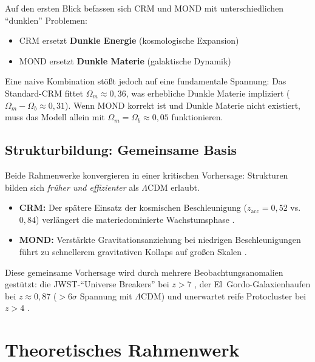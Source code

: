 \documentclass[aps,prd,twocolumn,superscriptaddress,nofootinbib,floatfix]{revtex4-2}
\begin{document}
Auf den ersten Blick befassen sich CRM und MOND mit unterschiedlichen "`dunklen"' Problemen:
\begin{itemize}
\item CRM ersetzt \textbf{Dunkle Energie} (kosmologische Expansion)
\item MOND ersetzt \textbf{Dunkle Materie} (galaktische Dynamik)
\end{itemize}

Eine naive Kombination stößt jedoch auf eine fundamentale Spannung: Das Standard-CRM fittet $\Omega_m \approx 0{,}36$, was erhebliche Dunkle Materie impliziert ($\Omega_m - \Omega_b \approx 0{,}31$). Wenn MOND korrekt ist und Dunkle Materie nicht existiert, muss das Modell allein mit $\Omega_m = \Omega_b \approx 0{,}05$ funktionieren.

\subsection{Strukturbildung: Gemeinsame Basis}

Beide Rahmenwerke konvergieren in einer kritischen Vorhersage: Strukturen bilden sich \textit{früher und effizienter} als $\Lambda$CDM erlaubt.

\begin{itemize}
\item \textbf{CRM:} Der spätere Einsatz der kosmischen Beschleunigung ($z_{\mathrm{acc}} = 0{,}52$ vs.\ $0{,}84$) verlängert die materiedominierte Wachstumsphase \cite{Geiger2026}.
\item \textbf{MOND:} Verstärkte Gravitationsanziehung bei niedrigen Beschleunigungen führt zu schnellerem gravitativen Kollaps auf großen Skalen \cite{Asencio2023}.
\end{itemize}

Diese gemeinsame Vorhersage wird durch mehrere Beobachtungsanomalien gestützt: die JWST-"`Universe Breakers"' bei $z > 7$ \cite{Labbe2023, BoylanKolchin2023}, der El~Gordo-Galaxienhaufen bei $z \approx 0{,}87$ (${>}6\sigma$ Spannung mit $\Lambda$CDM) \cite{Asencio2023} und unerwartet reife Protocluster bei $z > 4$ \cite{Miller2018}.

\section{Theoretisches Rahmenwerk}
\label{sec:theory}
\end{document}
